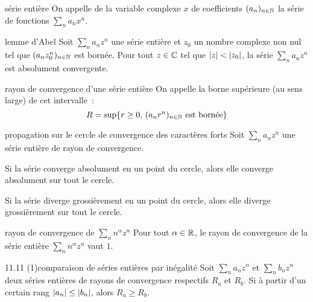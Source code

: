 

\begin{adjustwidth}{-3cm}{-3cm}


\begin{definition}{11.1}{série entière}
    On appelle de la variable complexe $x$ de coefficients $(a_n)_{n \in \mathbb{N}}$ la série de fonctions $\sum_{n}a_n x^n$.
\end{definition}

\begin{theoreme}{11.3}{lemme d'Abel}
    Soit $\sum_n a_nz^n$ une série entière et $z_0$ un nombre complexe non nul tel que $(a_nz_0^n)_{n \in \mathbb{N}}$ est bornée. Pour tout $z \in \mathbb{C}$ tel que $|z| < |z_0|$, la série $\sum_n a_n z^n$ est absolument convergente.
\end{theoreme}

\begin{definition}{11.4}{rayon de convergence d'une série entière}
    On appelle  la borne supérieure (au sens large) de cet intervalle~:
    $$R = \sup\{r \geq 0,\, (a_nr^n)_{n \in \mathbb{N}}\text{ est bornée}\}$$

\end{definition}

\begin{theoreme}{11.5}{propagation sur le cercle de convergence des caractères forts}
    Soit $\sum_n a_nz^n$ une série entière de rayon de convergence. 
    \begin{enumeratebf}
        \item  Si la série converge absolument en un point du cercle, alors elle converge absolument sur tout le cercle.
        \item Si la série diverge grossièrement en un point du cercle, alors elle diverge grossièrement sur tout le cercle.
    \end{enumeratebf}
    
\end{theoreme}

\begin{proposition}{11.8}{rayon de convergence de $\sum_n n^\alpha z^n$}
    Pour tout $\alpha \in \mathbb{R}$, le rayon de convergence de la série entière $\sum_n n^\alpha z^n$ vaut $1$.
\end{proposition}

\begin{proposition}{11.11 (1)}{comparaison de séries entières par inégalité}
    Soit $\sum_n a_n z^n$ et $\sum_n b_n z^n$ deux séries entières de rayons de convergence respectifs $R_a$ et $R_b$. Si à partir d'un certain rang $|a_n| \leq |b_n|$, alors $R_a \geq R_b$.
\end{proposition}


\end{adjustwidth}
